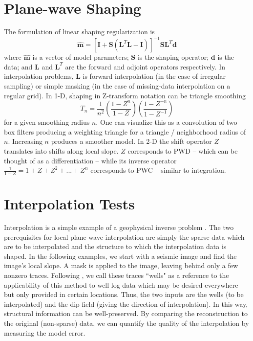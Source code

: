 \section{Plane-wave Shaping}
The formulation of linear shaping regularization is \cite[]{fomel07}
\begin{equation}
\mathbf{\hat{m}}=\left[\mathbf{I}+\mathbf{S}\left(\mathbf{L}^T\mathbf{L}-\mathbf{I}\right)\right]^{-1}\mathbf{S}\mathbf{L}^T\mathbf{d}
\end{equation}
where $\mathbf{\hat{m}}$ is a vector of model parameters; $\mathbf{S}$ is the shaping operator; $\mathbf{d}$ is the data; and $\mathbf{L}$ and $\mathbf{L}^T$ are the forward and adjoint operators respectively. In interpolation problems, $\mathbf{L}$ is forward interpolation (in the case of irregular sampling) or simple masking (in the case of missing-data interpolation on a regular grid). In 1-D, shaping in Z-transform notation can be triangle smoothing  \cite[]{claerbout92}
\begin{equation}
T_n=\frac{1}{n^2}\left(\frac{1-Z^n}{1-Z}\right)\left(\frac{1-Z^{-n}}{1-Z^{-1}}\right)
\end{equation}
for a given smoothing radius $n$. One can visualize this as a convolution of two box filters producing a weighting triangle for a triangle / neighborhood radius of $n$. Increasing $n$ produces a smoother model. In 2-D the shift operator $Z$ translates into shifts along local slope. $Z$ corresponds to PWD -- which can be thought of as a differentiation -- while its inverse operator $\frac{1}{1-Z}=1+Z+Z^2+...+Z^n$ corresponds to PWC -- similar to integration. 
\section{Interpolation Tests}
Interpolation is a simple example of a geophysical inverse problem \cite[]{claerbout14}. The two prerequisites for local plane-wave interpolation are simply the sparse data which are to be interpolated and the structure to which the interpolation data is shaped. In the following examples, we start with a seismic image and find the image's local slope. A mask is applied to the image, leaving behind only a few nonzero traces. Following \cite{clapp98,clapp04}, we call these traces ``wells" as a reference to the applicability of this method to well log data which may be desired everywhere but only provided in certain locations. Thus, the two inputs are the wells (to be interpolated) and the dip field (giving the direction of interpolation). In this way, structural information can be well-preserved. By comparing the reconstruction to the original (non-sparse) data, we can quantify the quality of the interpolation by measuring the model error.\\
\\
